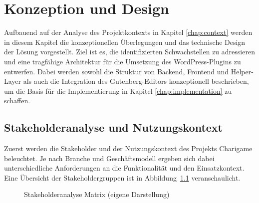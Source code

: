 \chapter{Konzeption und Design}
\label{chap:concept}
Aufbauend auf der Analyse des Projektkontexts in Kapitel \ref{chap:context} werden in diesem Kapitel die konzeptionellen Überlegungen und das technische Design der Lösung vorgestellt. Ziel ist es, die identifizierten Schwachstellen zu adressieren und eine tragfähige Architektur für die Umsetzung des WordPress-Plugins zu entwerfen. Dabei werden sowohl die Struktur von Backend, Frontend und Helper-Layer als auch die Integration des Gutenberg-Editors konzeptionell beschrieben, um die Basis für die Implementierung in Kapitel \ref{chap:implementation} zu schaffen.
\section{Stakeholderanalyse und Nutzungskontext}
Zuerst werden die Stakeholder und der Nutzungskontext des Projekts Charigame beleuchtet.
Je nach Branche und Geschäftsmodell ergeben sich dabei unterschiedliche Anforderungen an die Funktionalität und den Einsatzkontext.
Eine Übersicht der Stakeholdergruppen ist in Abbildung~\ref{fig:stakeholder} veranschaulicht.
\begin{figure}[H]
    \centering
    
    \caption{Stakeholderanalyse Matrix (eigene Darstellung)}
    \label{fig:stakeholder}
\end{figure}

